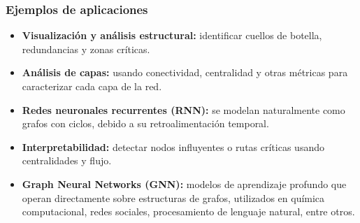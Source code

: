 \subsubsection*{Ejemplos de aplicaciones}

\begin{itemize}
    \item \textbf{Visualización y análisis estructural:} identificar cuellos de botella, redundancias y zonas críticas.
    \item \textbf{Análisis de capas:} usando conectividad, centralidad y otras métricas para caracterizar cada capa de la red.
    \item \textbf{Redes neuronales recurrentes (RNN):} se modelan naturalmente como grafos con ciclos, debido a su retroalimentación temporal.
    \item \textbf{Interpretabilidad:} detectar nodos influyentes o rutas críticas usando centralidades y flujo.
    \item \textbf{Graph Neural Networks (GNN):} modelos de aprendizaje profundo que operan directamente sobre estructuras de grafos, utilizados en química computacional, redes sociales, procesamiento de lenguaje natural, entre otros.
\end{itemize}



